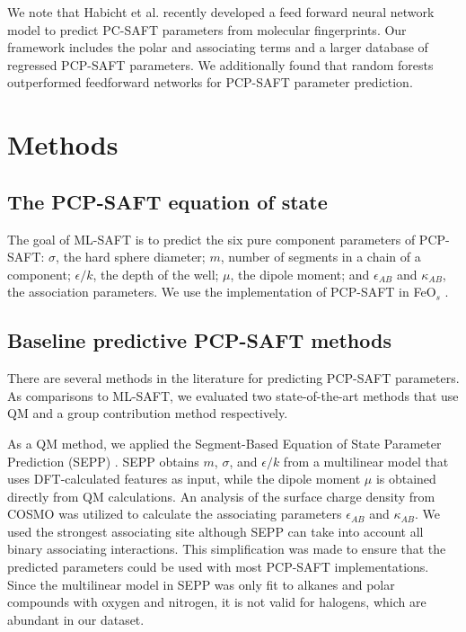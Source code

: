 We note that Habicht et al. \cite{Habicht2023} recently developed a feed forward neural network model to predict PC-SAFT parameters from molecular fingerprints. Our framework includes the polar and associating terms and a larger database of regressed PCP-SAFT parameters. We additionally found that random forests outperformed feedforward networks for PCP-SAFT parameter prediction.


\section{Methods}
\label{sec:methods}

\subsection{The PCP-SAFT equation of state}

The goal of ML-SAFT is to predict the six pure component parameters of PCP-SAFT: $\sigma$, the hard sphere diameter; $m$, number of segments in a chain of a component; $\epsilon/k$, the depth of the well; $\mu$, the dipole moment; and $\epsilon_{AB}$ and $\kappa_{AB}$, the association parameters. We use the implementation of PCP-SAFT in FeO$_{s}$ \cite{Rehner2023}.

\subsection{Baseline predictive PCP-SAFT methods}\label{sec:baselines}

There are several methods in the literature for predicting PCP-SAFT parameters. As comparisons to ML-SAFT, we evaluated two state-of-the-art methods that use QM and a group contribution method respectively.

As a QM method, we applied the Segment-Based Equation of State Parameter Prediction (SEPP) \cite{Kaminski2020}. SEPP obtains $m$, $\sigma$, and $\epsilon/k$ from a multilinear model that uses DFT-calculated features as input, while the dipole moment $\mu$ is obtained directly from QM calculations. An analysis of the surface charge density from COSMO\cite{Klamt1995} was utilized to calculate the associating parameters $\epsilon_{AB}$ and $\kappa_{AB}$. We used the strongest associating site although SEPP can take into account all binary associating interactions. This simplification was made to ensure that the predicted parameters could be used with most PCP-SAFT implementations. Since the multilinear model in SEPP was only fit to alkanes and polar compounds with oxygen and nitrogen, it is not valid for halogens, which are abundant in our dataset.

